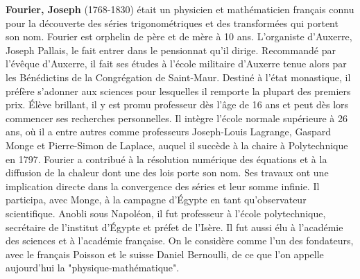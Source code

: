 \textbf{Fourier, Joseph} (1768-1830) était un physicien et mathématicien français connu pour la découverte des séries trigonométriques et des transformées qui portent son nom. Fourier est orphelin de père et de mère à 10 ans. L'organiste d'Auxerre, Joseph Pallais, le fait entrer dans le pensionnat qu'il dirige. Recommandé par l'évêque d'Auxerre, il fait ses études à l'école militaire d'Auxerre tenue alors par les Bénédictins de la Congrégation de Saint-Maur. Destiné à l'état monastique, il préfère s'adonner aux sciences pour lesquelles il remporte la plupart des premiers prix. Élève brillant, il y est promu professeur dès l'âge de 16 ans et peut dès lors commencer ses recherches personnelles. Il intègre l'école normale supérieure à 26 ans, où il a entre autres comme professeurs Joseph-Louis Lagrange, Gaspard Monge et Pierre-Simon de Laplace, auquel il succède à la chaire à Polytechnique en 1797. Fourier a contribué à la résolution numérique des équations et à la diffusion de la chaleur dont une des lois porte son nom. Ses travaux ont une implication directe dans la convergence des séries et leur somme infinie. Il participa, avec Monge, à la campagne d'Égypte en tant qu'observateur scientifique. Anobli sous Napoléon, il fut professeur à l'école polytechnique, secrétaire de l'institut d'Égypte et préfet de l'Isère. Il fut aussi élu à l'académie des sciences et à l'académie française. On le considère comme l'un des fondateurs, avec le français Poisson et le suisse Daniel Bernoulli, de ce que l'on appelle aujourd'hui la "physique-mathématique".

